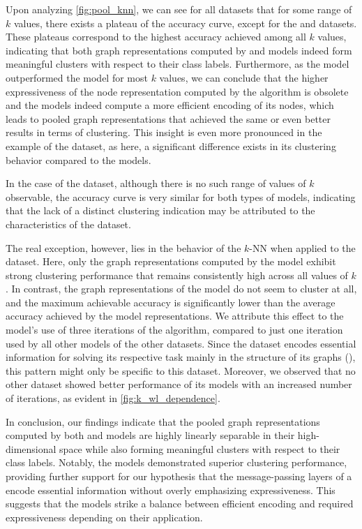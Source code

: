 Upon analyzing \cref{fig:pool_knn}, we can see for all datasets that for some range of $k$ values, there exists a plateau of the accuracy curve, except for the \enzymes and \nci datasets. These plateaus correspond to the highest accuracy achieved among all $k$ values, indicating that both graph representations computed by \wlnn and \gnn models indeed form meaningful clusters with respect to their class labels. Furthermore, as the \gnn model outperformed the \wlnn model for most $k$ values, we can conclude that the higher expressiveness of the node representation computed by the \wl algorithm is obsolete and the \gnn models indeed compute a more efficient encoding of its nodes, which leads to pooled graph representations that achieved the same or even better results in terms of clustering. This insight is even more pronounced in the example of the \reddit dataset, as here, a significant difference exists in its clustering behavior compared to the \wlnn models.

In the case of the \enzymes dataset, although there is no such range of values of $k$ observable, the accuracy curve is very similar for both types of models, indicating that the lack of a distinct clustering indication may be attributed to the characteristics of the dataset.

The real exception, however, lies in the behavior of the \textsf{$k$-NN} when applied to the \nci dataset. Here, only the graph representations computed by the \wlnn model exhibit strong clustering performance that remains consistently high across all values of $k$. In contrast, the graph representations of the \gnn model do not seem to cluster at all, and the maximum achievable accuracy is significantly lower than the average accuracy achieved by the \wlnn model representations. We attribute this effect to the \wlnn model's use of three iterations of the \wl algorithm, compared to just one iteration used by all other models of the other datasets. Since the \nci dataset encodes essential information for solving its respective task mainly in the structure of its graphs (\cite{Liu2022}), this pattern might only be specific to this dataset. Moreover, we observed that no other dataset showed better performance of its \wlnn models with an increased number of \wl iterations, as evident in \cref{fig:k_wl_dependence}.\bigskip

In conclusion, our findings indicate that the pooled graph representations computed by both \wlnn and \gnn models are highly linearly separable in their high-dimensional space while also forming meaningful clusters with respect to their class labels. Notably, the \gnn models demonstrated superior clustering performance, providing further support for our hypothesis that the message-passing layers of a \gnn encode essential information without overly emphasizing expressiveness. This suggests that the \gnn models strike a balance between efficient encoding and required expressiveness depending on their application.

